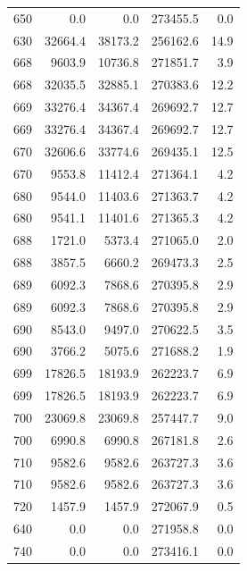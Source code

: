 \begin{longtable}{rrrrr}
    650 & \num{0.0} & \num{0.0} & \num{273455.5} & 0.0 \\
    630 & \num{32664.4} & \num{38173.2} & \num{256162.6} & 14.9 \\
    668 & \num{9603.9} & \num{10736.8} & \num{271851.7} & 3.9 \\
    668 & \num{32035.5} & \num{32885.1} & \num{270383.6} & 12.2 \\
    669 & \num{33276.4} & \num{34367.4} & \num{269692.7} & 12.7 \\
    669 & \num{33276.4} & \num{34367.4} & \num{269692.7} & 12.7 \\
    670 & \num{32606.6} & \num{33774.6} & \num{269435.1} & 12.5 \\
    670 & \num{9553.8} & \num{11412.4} & \num{271364.1} & 4.2 \\
    680 & \num{9544.0} & \num{11403.6} & \num{271363.7} & 4.2 \\
    680 & \num{9541.1} & \num{11401.6} & \num{271365.3} & 4.2 \\
    688 & \num{1721.0} & \num{5373.4} & \num{271065.0} & 2.0 \\
    688 & \num{3857.5} & \num{6660.2} & \num{269473.3} & 2.5 \\
    689 & \num{6092.3} & \num{7868.6} & \num{270395.8} & 2.9 \\
    689 & \num{6092.3} & \num{7868.6} & \num{270395.8} & 2.9 \\
    690 & \num{8543.0} & \num{9497.0} & \num{270622.5} & 3.5 \\
    690 & \num{3766.2} & \num{5075.6} & \num{271688.2} & 1.9 \\
    699 & \num{17826.5} & \num{18193.9} & \num{262223.7} & 6.9 \\
    699 & \num{17826.5} & \num{18193.9} & \num{262223.7} & 6.9 \\
    700 & \num{23069.8} & \num{23069.8} & \num{257447.7} & 9.0 \\
    700 & \num{6990.8} & \num{6990.8} & \num{267181.8} & 2.6 \\
    710 & \num{9582.6} & \num{9582.6} & \num{263727.3} & 3.6 \\
    710 & \num{9582.6} & \num{9582.6} & \num{263727.3} & 3.6 \\
    720 & \num{1457.9} & \num{1457.9} & \num{272067.9} & 0.5 \\
    640 & \num{0.0} & \num{0.0} & \num{271958.8} & 0.0 \\
    740 & \num{0.0} & \num{0.0} & \num{273416.1} & 0.0 \\

\end{longtable}
